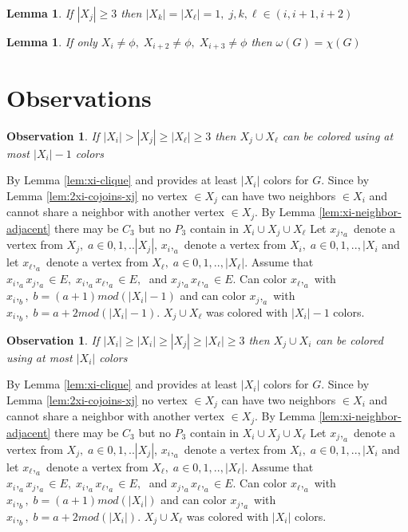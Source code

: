 \documentclass[12pt]{article}
\newtheorem{Lemma}[Theorem]{Lemma}
\newtheorem{Observation}[Theorem]{Observation}
\begin{document}
\begin{Lemma}\label{lem:three-consecutive-xi}
If $|X_j| \geq 3$ then $|X_k| = |X_\ell| = 1,\; j,k,\ell \in ({i,i+1,i+2})$
\end{Lemma}

\begin{Lemma}\label{lem:coloring-xi-xi2-xi3}
If only $X_i \neq \phi,\; X_{i+2} \neq \phi,\; X_{i+3} \neq \phi$ then $ \omega(G) = \chi(G)$
\end{Lemma}

\section{Observations}\label{sec:obs}
\begin{Observation}\label{obs:xj-uses-xi-one}
If $|X_i| > |X_j| \geq |X_\ell| \geq 3$ then $X_j \cup X_\ell$ can be colored using at most $|X_i| -1$ colors
\end{Observation} 
 By Lemma \ref{lem:xi-clique} and provides at least $|X_i|$ colors for $G$. Since by Lemma \ref{lem:2xi-cojoins-xj} no vertex $\in X_j$ can have two neighbors $\in X_i$ and cannot share a neighbor with another vertex $\in X_j$. By Lemma \ref{lem:xi-neighbor-adjacent} there may be $C_3$ but no $P_3$ contain in $X_i \cup X_j \cup X_\ell$ Let $x_j,_a$ denote a vertex from $X_j,\; a \in {0, 1,..|X_j|}$, $x_i,_a$ denote a vertex from $X_i,\; a \in {0, 1,.., |X_i}$ and let $x_\ell,_a$ denote a vertex from $X_\ell, \; a \in {0, 1,.., |X_\ell|}$. Assume that $x_i,_ax_j,_a \in E,\; x_i,_ax_\ell,_a \in E,\;$ and $ x_j,_ax_\ell,_a \in E$. Can color $x_\ell,_a$ with $x_i,_{b},\; b = (a +1) mod (|X_i| - 1)$ and can color $x_j,_a$ with $x_i,_{b},\; b = a+2 mod(|X_i| - 1)$.  $X_j \cup X_\ell$ was colored with $|X_i| - 1$ colors.

\begin{Observation}\label{obs:xi-g-xj-g-xl}
If $|X_i| \geq |X_i| \geq |X_j| \geq |X_\ell| \geq 3$ then $X_j \cup X_i$ can be colored using at most $|X_i|$ colors
\end{Observation}
 By Lemma \ref{lem:xi-clique} and provides at least $|X_i|$ colors for $G$. Since by Lemma \ref{lem:2xi-cojoins-xj} no vertex $\in X_j$ can have two neighbors $\in X_i$ and cannot share a neighbor with another vertex $\in X_j$. By Lemma \ref{lem:xi-neighbor-adjacent} there may be $C_3$ but no $P_3$ contain in $X_i \cup X_j \cup X_\ell$ Let $x_j,_a$ denote a vertex from $X_j,\; a \in {0, 1,..|X_j|}$, $x_i,_a$ denote a vertex from $X_i,\; a \in {0, 1,.., |X_i}$ and let $x_\ell,_a$ denote a vertex from $X_\ell, \; a \in {0, 1,.., |X_\ell|}$. Assume that $x_i,_ax_j,_a \in E,\; x_i,_ax_\ell,_a \in E,\;$ and $ x_j,_ax_\ell,_a \in E$. Can color $x_\ell,_a$ with $x_i,_{b},\; b = (a +1) mod (|X_i|)$ and can color $x_j,_a$ with $x_i,_{b},\; b = a+2 mod(|X_i|)$.  $X_j \cup X_\ell$ was colored with $|X_i|$ colors.
\end{document}
